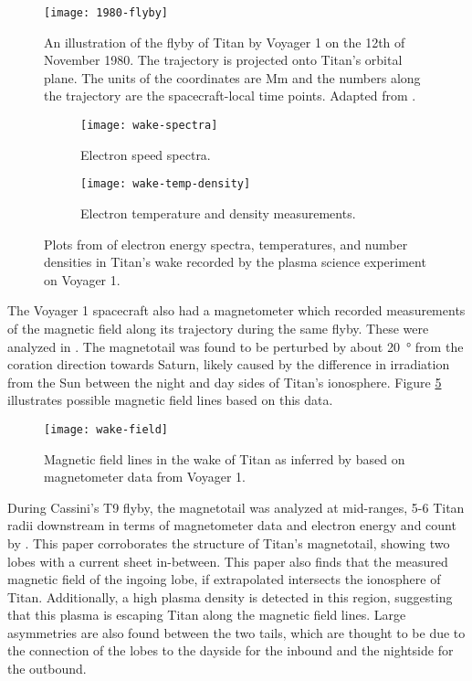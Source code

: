 \documentclass[12pt, parskip=full*, abstract]{scrartcl}
\begin{document}
\begin{figure}[htbp]
	\centering
	\texttt{[image: 1980-flyby]}
	\caption{An illustration of the flyby of Titan by Voyager 1 on the 12th of November 1980. The trajectory is projected onto Titan's orbital plane. The units of the coordinates are \si{\mega\metre} and the numbers along the trajectory are the spacecraft-local time points. Adapted from \textcite{hartle-1982}.}
	\label{fig:1980-flyby}
\end{figure}


\begin{figure}[htbp]
	\begin{subfigure}{\textwidth}
		\centering
		\texttt{[image: wake-spectra]}
		\caption{Electron speed spectra.}
		\label{fig:wake-spectra}	
	\end{subfigure}
	\begin{subfigure}{\textwidth}
		\centering
		\texttt{[image: wake-temp-density]}
		\caption{Electron temperature and density measurements.}
		\label{fig:wake-temp-density}
	\end{subfigure}
	\caption{Plots from \textcite{hartle-1982} of electron energy spectra, temperatures, and number densities in Titan's wake recorded by the plasma science experiment on Voyager 1.}
\end{figure}

The Voyager 1 spacecraft also had a magnetometer which recorded measurements of the magnetic field along its trajectory during the same flyby. These were analyzed in \textcite{ness-1982}. The magnetotail was found to be perturbed by about \SI{20}{\degree} from the coration direction towards Saturn, likely caused by the difference in irradiation from the Sun between the night and day sides of Titan's ionosphere. Figure \ref{fig:wake-field} illustrates possible magnetic field lines based on this data.

\begin{figure}[htbp]
	\centering
	\texttt{[image: wake-field]}
	\caption{Magnetic field lines in the wake of Titan as inferred by \textcite{ness-1982} based on magnetometer data from Voyager 1.}
	\label{fig:wake-field}
\end{figure}

During Cassini's T9 flyby, the magnetotail was analyzed at mid-ranges, 5-6 Titan radii downstream in terms of magnetometer data and electron energy and count by \textcite{Magnetotail-T9}. This paper corroborates the structure of Titan's magnetotail, showing two lobes with a current sheet in-between. This paper also finds that the measured magnetic field of the ingoing lobe, if extrapolated intersects the ionosphere of Titan. Additionally, a high plasma density is detected in this region, suggesting that this plasma is escaping Titan along the magnetic field lines. Large asymmetries are also found
between the two tails, which are thought to be due to the connection of the lobes to the dayside for the inbound and the nightside for the outbound.
\end{document}
